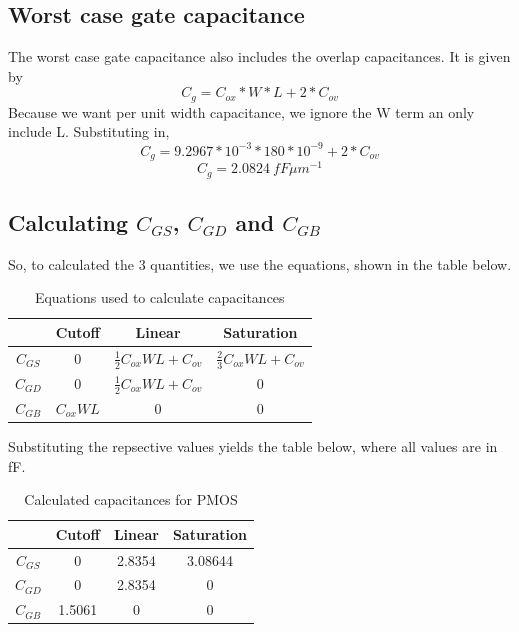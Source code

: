 \documentclass[12pt]{article}
\begin{document}
\subsection*{Worst case gate capacitance}
The worst case gate capacitance also includes the overlap capacitances. It is given by 
\[C_g = C_{ox} * W * L + 2*C_{ov}\]
Because we want per unit width capacitance, we ignore the W term an only include L.
Substituting in,
\[C_g = 9.2967*10^{-3} * 180*10^{-9} + 2 * C_{ov}\]
\[C_g = \SI{2.0824}{fF \mu m^{-1}}\]
\subsection*{Calculating $C_{GS}$, $C_{GD}$ and $C_{GB}$}
So, to calculated the 3 quantities, we use the equations, shown in the table below. 
\begin{table} [H]
    \centering
    \begin{tabular} {c|ccc}
        & Cutoff & Linear & Saturation \\
        \hline
        $C_{GS}$& 0 & $\frac{1}{2}C_{ox}WL + C_{ov}$ & $\frac{2}{3}C_{ox}WL + C_{ov}$ \\
        $C_{GD}$& 0 & $\frac{1}{2}C_{ox}WL + C_{ov}$ & 0\\
        $C_{GB}$& $C_{ox}WL$ & 0 & 0\\
    \end{tabular}
    \caption{Equations used to calculate capacitances}
\end{table}
Substituting the repsective values yields the table below, where all values are in fF.
\begin{table} [H]
    \centering
    \begin{tabular} {c|ccc}
        & Cutoff & Linear & Saturation \\
        \hline
        $C_{GS}$& 0 & 2.8354 & 3.08644 \\
        $C_{GD}$& 0 & 2.8354 & 0\\
        $C_{GB}$& 1.5061 & 0 & 0\\
    \end{tabular}
    \caption{Calculated capacitances for PMOS}
\end{table}
\end{document}
